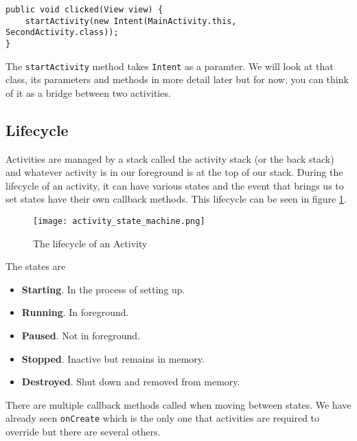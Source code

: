 \begin{lstlisting}[style=A_Java]
public void clicked(View view) {
    startActivity(new Intent(MainActivity.this, SecondActivity.class));
}	
\end{lstlisting}

The \texttt{startActivity} method takes \texttt{Intent} as a paramter. We will look at that class, its parameters and methods in more detail later but for now, you can think of it as a bridge between two activities. 

\subsection{Lifecycle}
Activities are managed by a stack called the activity stack (or the back stack) and whatever activity is in our foreground is at the top of our stack. During the lifecycle of an activity, it can have various states and the event that brings us to set states have their own callback methods. This lifecycle can be seen in figure \ref{fig:actlife}.

\begin{figure}[H]
\centering
\texttt{[image: activity\_state\_machine.png]}
\caption{The lifecycle of an Activity}
\label{fig:actlife}
\end{figure}

The states are
\begin{itemize}
	\item \textbf{Starting}. In the process of setting up.
	\item \textbf{Running}. In foreground.
	\item \textbf{Paused}. Not in foreground.
	\item \textbf{Stopped}. Inactive but remains in memory.
	\item \textbf{Destroyed}. Shut down and removed from memory.
\end{itemize}

There are multiple callback methods called when moving between states. We have already seen \texttt{onCreate} which is the only one that activities are required to override but there are several others.

